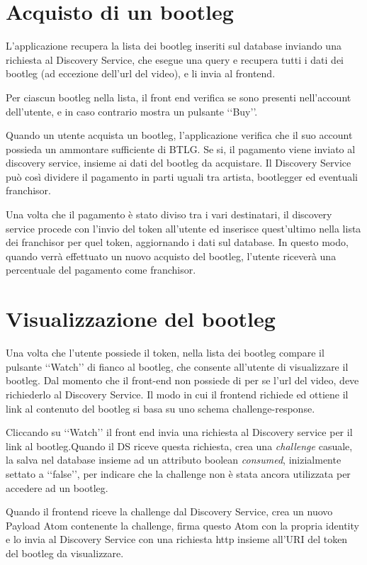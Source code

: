 \section{Acquisto di un bootleg}

L'applicazione recupera la lista dei bootleg inseriti sul database inviando una richiesta al Discovery Service, che esegue una query e recupera tutti i dati dei bootleg (ad eccezione dell'url del video), e li invia al frontend.

Per ciascun bootleg nella lista, il front end verifica se sono presenti nell'account dell'utente, e in caso contrario mostra un pulsante ‘‘Buy’’.

Quando un utente acquista un bootleg, l'applicazione verifica che il suo account possieda un ammontare sufficiente di BTLG. Se si, il pagamento viene inviato al discovery service, insieme ai dati del bootleg da acquistare. Il Discovery Service può così dividere il pagamento in parti uguali tra artista, bootlegger ed eventuali franchisor.

Una volta che il pagamento è stato diviso tra i vari destinatari, il discovery service procede con l'invio del token all'utente ed inserisce quest'ultimo nella lista dei franchisor per quel token, aggiornando i dati sul database. In questo modo, quando verrà effettuato un nuovo acquisto del bootleg, l'utente riceverà una percentuale del pagamento come franchisor. 

\section{Visualizzazione del bootleg}

Una volta che l'utente possiede il token, nella lista dei bootleg compare il pulsante ‘‘Watch’’ di fianco al bootleg, che consente all'utente di visualizzare il bootleg. Dal momento che il front-end non possiede di per se l'url del video, deve richiederlo al Discovery Service. Il modo in cui il frontend richiede ed ottiene il link al contenuto del bootleg si basa su uno schema challenge-response. 

Cliccando su ‘‘Watch’’ il front end invia una richiesta al Discovery service per il link al bootleg.Quando il DS riceve questa richiesta, crea una \textit{challenge} casuale, la salva nel database insieme ad un attributo boolean \textit{consumed}, inizialmente settato a ‘‘false’’, per indicare che la challenge non è stata ancora utilizzata per accedere ad un bootleg. 

Quando il frontend riceve la challenge dal Discovery Service, crea un nuovo Payload Atom contenente la challenge, firma questo Atom con la propria identity e lo invia al Discovery Service con una richiesta http insieme all'URI del token del bootleg da visualizzare.

